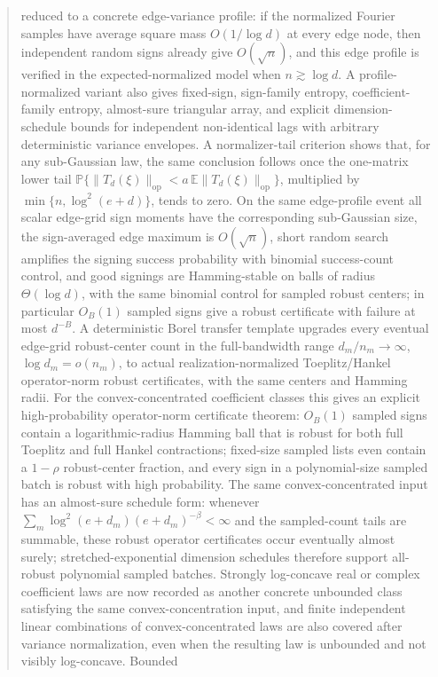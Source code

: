 \documentclass[11pt]{amsart}
\numberwithin{equation}{section}
\theoremstyle{definition}
\theoremstyle{remark}
\newcommand{\op}{\mathrm{op}}
\newcommand{\Prob}{\mathbb P}
\newcommand{\Exp}{\mathbb E}
\begin{document}
\begin{abstract}
reduced to a concrete edge-variance profile: if the normalized Fourier samples
have average square mass \(O(1/\log d)\) at every edge node, then independent
random signs already give \(O(\sqrt n)\), and this edge profile is verified in
the expected-normalized model when \(n\gtrsim\log d\).  A profile-normalized
variant also gives fixed-sign, sign-family entropy, coefficient-family
entropy, almost-sure triangular array, and explicit dimension-schedule bounds
for independent non-identical lags with arbitrary deterministic variance
envelopes.  A
normalizer-tail
criterion shows that, for any sub-Gaussian law, the same conclusion follows once
the one-matrix lower tail
\(\Prob\{\|T_d(\xi)\|_{\op}<a\,\Exp\|T_d(\xi)\|_{\op}\}\), multiplied by
\(\min\{n,\log^2(e+d)\}\), tends to zero.  On the same edge-profile event all scalar edge-grid
sign moments have the corresponding sub-Gaussian size, the sign-averaged
edge maximum is \(O(\sqrt n)\), short random search amplifies the signing
success probability with binomial success-count control, and good signings are Hamming-stable on balls of radius
\(\Theta(\log d)\), with the same binomial control for sampled robust centers;
in particular \(O_B(1)\) sampled signs give a robust certificate with failure
at most \(d^{-B}\).  A deterministic Borel transfer template upgrades every
eventual edge-grid robust-center count in the full-bandwidth range
\(d_m/n_m\to\infty\), \(\log d_m=o(n_m)\), to actual realization-normalized
Toeplitz/Hankel operator-norm robust certificates, with the same centers and
Hamming radii.  For the convex-concentrated coefficient classes this gives an
explicit high-probability operator-norm certificate theorem: \(O_B(1)\) sampled
signs contain a logarithmic-radius Hamming ball that is robust for both full
Toeplitz and full Hankel contractions; fixed-size sampled lists even contain a
\(1-\rho\) robust-center fraction, and every sign in a polynomial-size sampled
batch is robust with high probability.  The same convex-concentrated input has
an almost-sure schedule form: whenever
\(\sum_m\log^2(e+d_m)(e+d_m)^{-\beta}<\infty\) and the sampled-count tails are
summable, these robust operator certificates occur eventually almost surely;
stretched-exponential dimension schedules therefore support all-robust
polynomial sampled batches.  Strongly log-concave real or complex coefficient
laws are now recorded as another concrete unbounded class satisfying the same
convex-concentration input, and finite independent linear combinations of
convex-concentrated laws are also covered after variance normalization, even
when the resulting law is unbounded and not visibly log-concave.  Bounded

\end{abstract}
\end{document}
